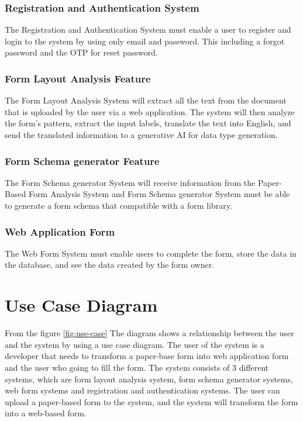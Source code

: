 \documentclass[12pt,oneside,openright,a4paper]{cpe-english-project}
\begin{document}
\subsubsection{Registration and Authentication System}

The Registration and Authentication System must enable a user to register and login to the system by using only email and password. This including a forgot password and the  OTP for reset password.

\subsubsection{Form Layout Analysis Feature}

The Form Layout Analysis System will extract all the text from the document that is uploaded by the user via a web application. The system will then analyze the form’s pattern, extract the input labels, translate the text into English, and send the translated information to a generative AI for data type generation.

\subsubsection{Form Schema generator Feature}

The Form Schema generator System will receive information from the Paper-Based Form Analysis System and Form Schema generator System must be able to generate a form schema that compatible with a form library.

\subsubsection{Web Application Form}

The Web Form System must enable users to complete the form, store the data in the database, and see the data created by the form owner.


\section{Use Case Diagram}

From the figure \ref{fig:use-case} The diagram shows a relationship between the user and the system by using a use case diagram. The user of the system is a developer that needs to transform a paper-base form into web application form and the user who going to fill the form. The system consists of 3 different systems, which are form layout analysis system, form schema generator systems, web form systems and registration and authentication systems. The user can upload a paper-based form to the system, and the system will transform the form into a web-based form.
\end{document}
